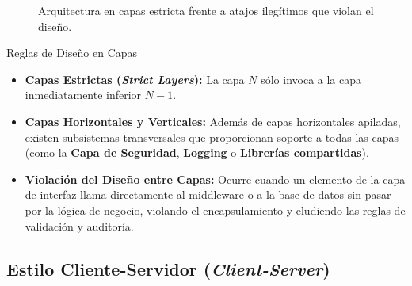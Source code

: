 \begin{figure}[htbp]
\centering
{}
\caption{Arquitectura en capas estricta frente a atajos ilegítimos que violan el diseño.}
\label{fig:layers}
\end{figure}

\begin{importante}{Reglas de Diseño en Capas}
\begin{itemize}[leftmargin=1.5em]
  \item \textbf{Capas Estrictas (\emph{Strict Layers}):} La capa $N$ sólo invoca a la capa inmediatamente inferior $N-1$.
  \item \textbf{Capas Horizontales y Verticales:} Además de capas horizontales apiladas, existen subsistemas transversales que proporcionan soporte a todas las capas (como la \textbf{Capa de Seguridad}, \textbf{Logging} o \textbf{Librerías compartidas}).
  \item \textbf{Violación del Diseño entre Capas:} Ocurre cuando un elemento de la capa de interfaz llama directamente al middleware o a la base de datos sin pasar por la lógica de negocio, violando el encapsulamiento y eludiendo las reglas de validación y auditoría.
\end{itemize}
\end{importante}

\subsection{Estilo Cliente-Servidor (\emph{Client-Server})}

